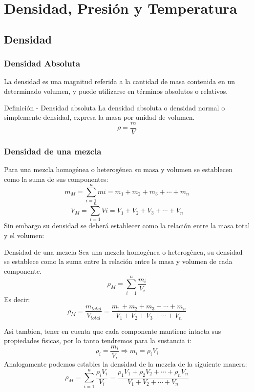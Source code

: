 \section{Densidad, Presión y Temperatura}
\subsection*{Densidad}
\subsubsection*{Densidad Absoluta}
La densidad es una magnitud referida a la cantidad de masa contenida en un determinado volumen, y puede utilizarse en términos absolutos o relativos.
\begin{Theorem*} {Definición - Densidad absoluta}
	La densidad absoluta o densidad normal o simplemente densidad, expresa la masa por unidad de volumen.
	$$ \rho=\frac{m}{V} $$
\end{Theorem*}
\subsubsection*{Densidad de una mezcla}
Para una mezcla homogénea o heterogénea su masa y volumen se establecen como la suma de sus componentes:
$$ m_M = \sum_{i=1}^{n}mi=m_1+m_2+m_3+\cdots+m_n $$
$$ V_M = \sum_{i=1}^{n}Vi=V_1+V_2+V_3+\cdots+V_n $$
Sin embargo su densidad se deberá establecer como la relación entre la masa total y el volumen:
\begin{Theorem*} {Densidad de una mezcla}
	Sea una mezcla homogénea o heterogénea, su densidad se establece como la suma entre la relación entre ls masa y volumen de cada componente.
	$$\rho_M=\sum_{i=1}^{n}\frac{m_i}{V_i}$$
	Es decir:
	$$\rho_M=\frac{m_{total}}{V_{total}}=\frac{m_1+m_2+m_3+\cdots+m_n}{V_1+V_2+V_3+\cdots+V_n}$$
\end{Theorem*}
Asi tambien, tener en cuenta que cada componente mantiene intacta sus propiedades fisicas, por lo tanto tendremos para la sustancia i:
$$ \rho_i = \frac{m_i}{V_i} \Rightarrow m_i=\rho_iV_i $$
Analogamente podemos estables la densidad de la mezcla de la siguiente manera:
$$ \rho_M = \sum_{i=1}^{n} \frac{\rho_iV_i}{V_i}=\frac{\rho_1V_1+\rho_2V_2+\cdots+\rho_nV_n}{V_1+V_2+\cdots+V_n} $$
